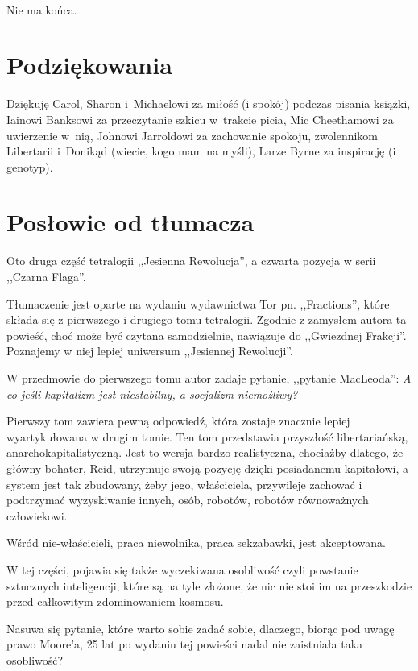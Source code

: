 \documentclass[oneside,polish,11pt,sfheadings]{mwbk}
\begin{document}
~

Nie ma końca.

\chapter*{Podziękowania}

Dziękuję Carol, Sharon i~Michaelowi za miłość (i spokój) podczas
pisania książki, Iainowi Banksowi za przeczytanie szkicu w~trakcie
picia, Mic Cheethamowi za uwierzenie w~nią, Johnowi Jarroldowi za
zachowanie spokoju, zwolennikom Libertarii i~Donikąd (wiecie, kogo mam
na myśli), Larze Byrne za inspirację (i genotyp).

\chapter*{Posłowie od tłumacza}

Oto druga część tetralogii ,,Jesienna Rewolucja'', a czwarta pozycja w serii ,,Czarna Flaga''. 

Tłumaczenie jest oparte na wydaniu wydawnictwa Tor pn. ,,Fractions'', które składa się z pierwszego i drugiego tomu tetralogii. Zgodnie z zamysłem autora ta powieść, choć może być czytana samodzielnie, nawiązuje do ,,Gwiezdnej Frakcji''. Poznajemy w niej lepiej uniwersum ,,Jesiennej Rewolucji''.

W przedmowie do pierwszego tomu autor zadaje pytanie, ,,pytanie MacLeoda'':
\emph{A co jeśli kapitalizm jest niestabilny, a socjalizm niemożliwy?}

Pierwszy tom zawiera pewną odpowiedź, która zostaje znacznie lepiej wyartykułowana w drugim tomie. Ten tom przedstawia przyszłość libertariańską, anarchokapitalistyczną.
Jest to wersja bardzo realistyczna, chociażby dlatego, że główny bohater, Reid, utrzymuje swoją pozycję dzięki posiadanemu kapitałowi, a system jest tak zbudowany, żeby jego, właściciela, przywileje zachować i podtrzymać wyzyskiwanie innych, osób, robotów, robotów równoważnych człowiekowi.

Wśród nie-właścicieli, praca niewolnika, praca sekzabawki, jest akceptowana.

W tej części, pojawia się także wyczekiwana osobliwość czyli powstanie sztucznych inteligencji, które są na tyle złożone, że nic nie stoi im na przeszkodzie przed całkowitym zdominowaniem kosmosu.

Nasuwa się pytanie, które warto sobie zadać sobie, dlaczego, biorąc pod uwagę prawo Moore'a,  25 lat po wydaniu tej powieści nadal nie zaistniała taka osobliwość?
\end{document}
